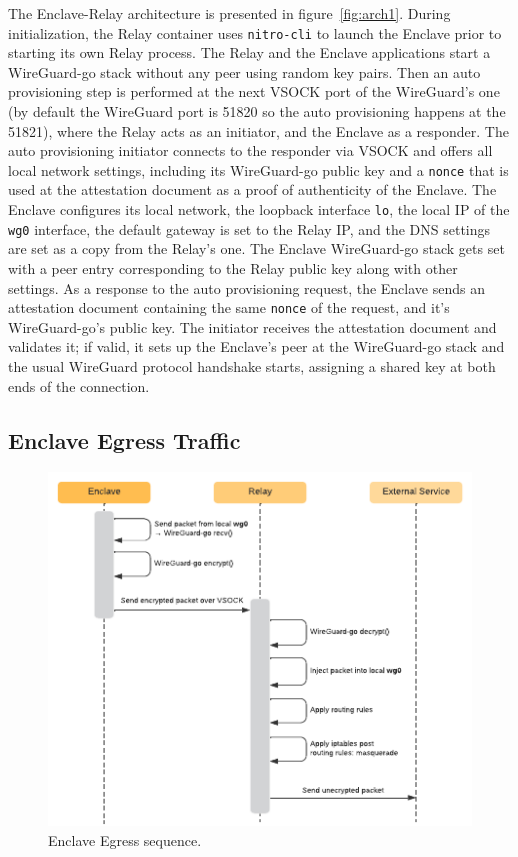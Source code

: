 \documentclass[a4paper, twocolumn]{article}
\begin{document}
The Enclave-Relay architecture is presented in figure~\ref{fig:arch1}. During
initialization, the Relay container uses \texttt{nitro-cli} to launch the
Enclave prior to starting its own Relay process. The Relay and the Enclave
applications start a WireGuard-go stack without any peer using random key
pairs. Then an auto provisioning step is performed at the next VSOCK port of
the WireGuard's one (by default the WireGuard port is 51820 so the auto
provisioning happens at the 51821), where the Relay acts as an initiator, and
the Enclave as a responder. The auto provisioning initiator connects to the
responder via VSOCK and offers all local network settings, including its
WireGuard-go public key and a \texttt{nonce} that is used at the attestation
document as a proof of authenticity of the Enclave. The Enclave configures its
local network, the loopback interface \texttt{lo}, the local IP of the
\texttt{wg0} interface, the default gateway is set to the Relay IP, and the DNS
settings are set as a copy from the Relay's one. The Enclave WireGuard-go stack
gets set with a peer entry corresponding to the Relay public key along with
other settings. As a response to the auto provisioning request, the Enclave
sends an attestation document containing the same \texttt{nonce} of the
request, and it's WireGuard-go's public key. The initiator receives the
attestation document and validates it; if valid, it sets up the Enclave's peer
at the WireGuard-go stack and the usual WireGuard protocol handshake starts,
assigning a shared key at both ends of the connection.

\subsection{Enclave Egress Traffic}

\begin{figure}
  \centering
  \includegraphics[width=\linewidth,keepaspectratio]{egress-sequence.pdf}
  \caption{Enclave Egress sequence.}\label{fig:egress-sequence1}
\end{figure}
\end{document}

